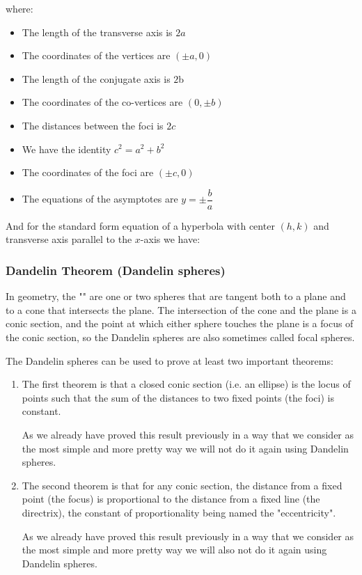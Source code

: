 	where:
	\begin{itemize}
		\item The length of the transverse axis is $2a$
		\item The coordinates of the vertices are $(\pm a,0)$
		\item The length of the conjugate axis is $2$b
		\item The coordinates of the co-vertices are $(0,\pm b)$
		\item The distances between the foci is $2c$
		\item We have the identity $c^2=a^2+b^2$
		\item The coordinates of the foci are $(\pm c,0)$
		\item The equations of the asymptotes are $y=\pm\displaystyle \dfrac{b}{a}$
	\end{itemize}
	And for the standard form equation of a hyperbola with center $(h,k)$ and transverse axis parallel to the $x$-axis we have:
	
	
	\pagebreak
	\subsubsection{Dandelin Theorem (Dandelin spheres)}
	In geometry, the "" are one or two spheres that are tangent both to a plane and to a cone that intersects the plane. The intersection of the cone and the plane is a conic section, and the point at which either sphere touches the plane is a focus of the conic section, so the Dandelin spheres are also sometimes called focal spheres.
	
	The Dandelin spheres can be used to prove at least two important theorems:
	\begin{enumerate}
		\item The first theorem is that a closed conic section (i.e. an ellipse) is the locus of points such that the sum of the distances to two fixed points (the foci) is constant. 
		
		As we already have proved this result previously in a way that we consider as the most simple and more pretty way we will not do it again using Dandelin spheres.

		\item The second theorem is that for any conic section, the distance from a fixed point (the focus) is proportional to the distance from a fixed line (the directrix), the constant of proportionality being named the "eccentricity".
		
		As we already have proved this result previously in a way that we consider as the most simple and more pretty way we will also not do it again using Dandelin spheres. 
	\end{enumerate}
	
